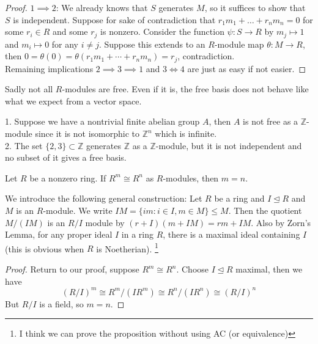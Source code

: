 \begin{proof}
    $1\implies 2$: We already knows that $S$ generates $M$, so it suffices to show that $S$ is independent.
    Suppose for sake of contradiction that $r_1m_1+\ldots+r_nm_n=0$ for some $r_i\in R$ and some $r_j$ is nonzero.
    Consider the function $\psi:S\to R$ by $m_j\mapsto 1$ and $m_i\mapsto 0$ for any $i\neq j$.
    Suppose this extends to an $R$-module map $\theta:M\to R$, then $0=\theta(0)=\theta(r_1m_1+\cdots +r_nm_n)=r_j$, contradiction.\\
    Remaining implications $2\implies 3\implies 1$ and $3\iff 4$ are just as easy if not easier.
\end{proof}
Sadly not all $R$-modules are free.
Even if it is, the free basis does not behave like what we expect from a vector space.
\begin{example}
    1. Suppose we have a nontrivial finite abelian group $A$, then $A$ is not free as a $\mathbb Z$-module since it is not isomorphic to $\mathbb Z^n$ which is infinite.\\
    2. The set $\{2,3\}\subset\mathbb Z$ generates $\mathbb Z$ as a $\mathbb Z$-module, but it is not independent and no subset of it gives a free basis.
\end{example}
\begin{proposition}
    Let $R$ be a nonzero ring.
    If $R^m\cong R^n$ as $R$-modules, then $m=n$.
\end{proposition}
We introduce the following general construction: Let $R$ be a ring and $I\unlhd R$ and $M$ is an $R$-module.
We write $IM=\{im:i\in I,m\in M\}\le M$.
Then the quotient $M/(IM)$ is an $R/I$ module by $(r+I)(m+IM)=rm+IM$.
Also by Zorn's Lemma, for any proper ideal $I$ in a ring $R$, there is a maximal ideal containing $I$ (this is obvious when $R$ is Noetherian).
\footnote{I think we can prove the proposition without using AC (or equivalence)}
\begin{proof}
    Return to our proof, suppose $R^m\cong R^n$.
    Choose $I\unlhd R$ maximal, then we have
    $$(R/I)^m\cong R^m/(IR^m)\cong R^n/(IR^n)\cong (R/I)^n$$
    But $R/I$ is a field, so $m=n$.
\end{proof}